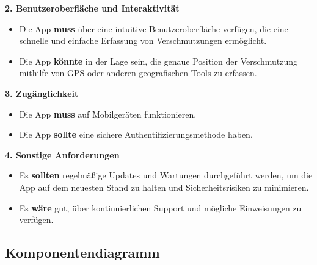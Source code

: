 \documentclass[a4paper,12pt]{article}
\begin{document}
\noindent\textbf{2. Benutzeroberfläche und Interaktivität}

\begin{itemize}
    \item Die App \textbf{muss} über eine intuitive Benutzeroberfläche verfügen, die eine schnelle und einfache Erfassung von Verschmutzungen ermöglicht.
    \item Die App \textbf{könnte} in der Lage sein, die genaue Position der Verschmutzung mithilfe von GPS oder anderen geografischen Tools zu erfassen.
\end{itemize}

\noindent\textbf{3. Zugänglichkeit}

\begin{itemize}
    \item Die App \textbf{muss} auf Mobilgeräten funktionieren.
    \item Die App \textbf{sollte} eine sichere Authentifizierungsmethode haben.
\end{itemize}

\noindent\textbf{4. Sonstige Anforderungen}

\begin{itemize}
    \item Es \textbf{sollten} regelmäßige Updates und Wartungen durchgeführt werden, um die App auf dem neuesten Stand zu halten und Sicherheitsrisiken zu minimieren.
    \item Es \textbf{wäre} gut, über kontinuierlichen Support und mögliche Einweisungen zu verfügen.
\end{itemize}

\clearpage
\subsection{Komponentendiagramm}
\label{sec:komponentendiagramm}
\end{document}
